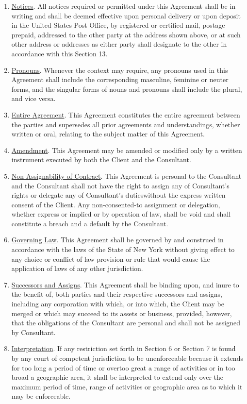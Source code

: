 \documentclass[12pt]{article}
\begin{document}
\begin{enumerate}
    \item \underline{Notices}. All notices required or permitted under this Agreement shall be in writing and shall be deemed effective upon personal delivery or upon deposit in the United States Post Office, by registered or certified mail, postage prepaid, addressed to the other party at the address shown above, or at such other address or addresses as either party shall designate to the other in accordance with this Section 13.
    \item \underline{Pronouns}. Whenever the context may require, any pronouns used in this Agreement shall include the corresponding masculine, feminine or neuter forms, and the singular forms of nouns and pronouns shall include the plural, and vice versa.
    \item \underline{Entire Agreement}. This Agreement constitutes the entire agreement between the parties and supersedes all prior agreements and understandings, whether written or oral, relating to the subject matter of this Agreement.
    \item \underline{Amendment}. This Agreement may be amended or modified only by a written instrument executed by both the Client and the Consultant.
    \item \underline{Non-Assignability of Contract}. This Agreement is personal to the Consultant and the Consultant shall not have the right to assign any of Consultant's rights or delegate any of Consultant's dutieswithout the express written consent of the Client.  Any non-consented-to assignment or delegation, whether express or implied or by operation of law, shall be void and shall constitute a breach and a default by the Consultant.
    \item \underline{Governing Law}.
    This Agreement shall be governed by and construed in accordance with the laws of the State of New York without giving effect to any choice or conflict of law provision or rule that would cause the application of laws of any other jurisdiction.
    \item \underline{Successors and Assigns}. This Agreement shall be binding upon, and inure to the benefit of, both parties and their respective successors and assigns, including any corporation with which, or into which, the Client may be merged or which may succeed to its assets or business, provided, however, that the obligations of the Consultant are personal and shall not be assigned by Consultant.
    \item \underline{Interpretation}. If any restriction set forth in Section 6 or Section 7 is found by any court of competent jurisdiction to be unenforceable because it extends for too long a period of time or overtoo great a range of activities or in too broad a geographic area, it shall be interpreted to extend only over the maximum period of time, range of activities or geographic area as to which it may be enforceable.

\end{enumerate}
\end{document}
